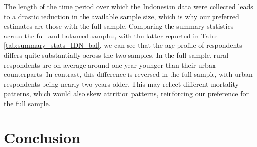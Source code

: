 \documentclass[12pt]{article}
\begin{document}
The length of the time period over which the Indonesian data were collected leads to a drastic reduction in the available sample size, which is why our preferred estimates are those with the full sample. 
Comparing the summary statistics across the full and balanced samples, with the latter reported in Table \ref{tab:summary_stats_IDN_bal}, we can see that the age profile of respondents differs quite substantially across the two samples.
In the full sample, rural respondents are on average around one year younger than their urban counterparts. 
In contrast, this difference is reversed in the full sample, with urban respondents being nearly two years older. 
This may reflect different mortality patterns, which would also skew attrition patterns, reinforcing our preference for the full sample. 







\FloatBarrier
\section{Conclusion}\label{sec:conclusion}
\end{document}
